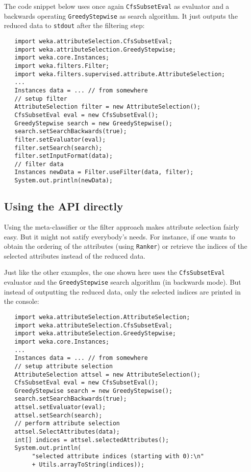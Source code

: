 The code snippet below uses once again \texttt{CfsSubsetEval} as evaluator and
a backwards operating \texttt{GreedyStepwise} as search algorithm. It just
outputs the reduced data to \texttt{stdout} after the filtering step:
\begin{verbatim}
   import weka.attributeSelection.CfsSubsetEval;
   import weka.attributeSelection.GreedyStepwise;
   import weka.core.Instances;
   import weka.filters.Filter;
   import weka.filters.supervised.attribute.AttributeSelection;
   ...
   Instances data = ... // from somewhere
   // setup filter
   AttributeSelection filter = new AttributeSelection();
   CfsSubsetEval eval = new CfsSubsetEval();
   GreedyStepwise search = new GreedyStepwise();
   search.setSearchBackwards(true);
   filter.setEvaluator(eval);
   filter.setSearch(search);
   filter.setInputFormat(data);
   // filter data
   Instances newData = Filter.useFilter(data, filter);
   System.out.println(newData);
\end{verbatim}

\newpage

\subsection{Using the API directly}
Using the meta-classifier or the filter approach makes attribute selection
fairly easy. But it might not satify everybody's needs. For instance, if one
wants to obtain the ordering of the attributes (using \texttt{Ranker}) or
retrieve the indices of the selected attributes instead of the reduced data.

Just like the other examples, the one shown here uses the
\texttt{CfsSubsetEval} evaluator and the \texttt{GreedyStepwise} search
algorithm (in backwards mode). But instead of outputting the reduced data, only
the selected indices are printed in the console:
\begin{verbatim}
   import weka.attributeSelection.AttributeSelection;
   import weka.attributeSelection.CfsSubsetEval;
   import weka.attributeSelection.GreedyStepwise;
   import weka.core.Instances;
   ...
   Instances data = ... // from somewhere
   // setup attribute selection
   AttributeSelection attsel = new AttributeSelection();
   CfsSubsetEval eval = new CfsSubsetEval();
   GreedyStepwise search = new GreedyStepwise();
   search.setSearchBackwards(true);
   attsel.setEvaluator(eval);
   attsel.setSearch(search);
   // perform attribute selection
   attsel.SelectAttributes(data);
   int[] indices = attsel.selectedAttributes();
   System.out.println(
        "selected attribute indices (starting with 0):\n"
        + Utils.arrayToString(indices));
\end{verbatim}

